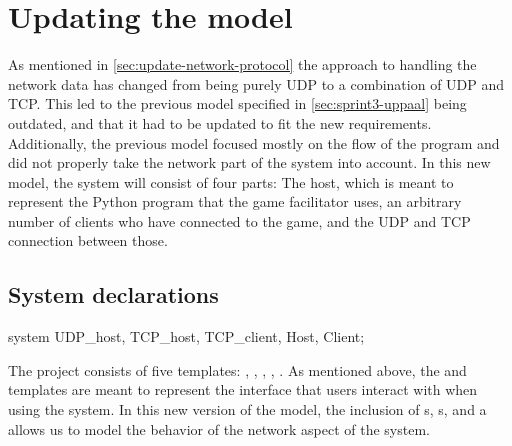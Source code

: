 \section{Updating the \uppaal model}
As mentioned in \autoref{sec:update-network-protocol} the approach to handling the network data has changed from being purely UDP to a combination of UDP and TCP.
This led to the previous \uppaal model specified in \autoref{sec:sprint3-uppaal} being outdated, and that it had to be updated to fit the new requirements.
\\
Additionally, the previous model focused mostly on the flow of the program and did not properly take the network part of the system into account.
In this new model, the system will consist of four parts: The host, which is meant to represent the Python program that the game facilitator uses, an arbitrary number of clients who have connected to the game, and the UDP and TCP connection between those.

\subsection{System declarations}
\begin{uppaalcode}[caption={System declarations}, label={lst:uppaal4:systemdecl},captionpos=b]
    system UDP_host, TCP_host, TCP_client, Host, Client;
\end{uppaalcode}
The project consists of five templates: , , , , .
As mentioned above, the  and  templates are meant to represent the interface that users interact with when using the system.
In this new version of the model, the inclusion of s, s, and a  allows us to model the behavior of the network aspect of the system.

